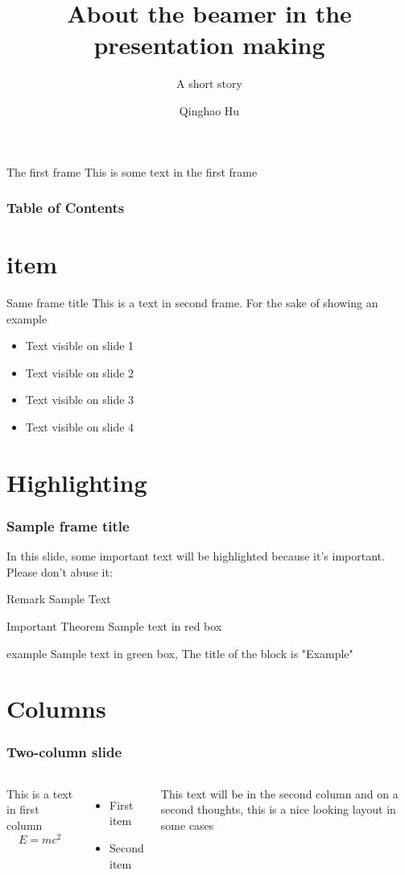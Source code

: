 \documentclass[10pt]{beamer}
\title[about the practice]
{About the beamer in the presentation making}
\subtitle{A short story}
\author{Qinghao Hu}
\begin{document}
\frame{\titlepage}

\begin{frame}{The first frame}
  This is some text in the first frame
\end{frame}

\begin{frame}
  \frametitle{Table of Contents}
  \tableofcontents
\end{frame}

\section{item}
\begin{frame}{Same frame title}
  This is a text in second frame. For the sake of showing an example
  \begin{itemize}
    \item Text visible on slide 1
    \item Text visible on slide 2 
    \item Text visible on slide 3
    \item Text visible on slide 4
  \end{itemize}
\end{frame}

\section{Highlighting}
\begin{frame}
  \frametitle{Sample frame title}
  In this slide, some important text will be \alert{highlighted} because it's important.
  Please don't abuse it:
  \begin{block}{Remark}
    Sample Text
  \end{block}

  \begin{alertblock}{Important Theorem} 
    Sample text in red box
  \end{alertblock}

  \begin{exampleblock}{example}
    Sample text in green box, The title of the block is "Example"
  \end{exampleblock}

\end{frame}

\section{Columns}
\begin{frame}
  \frametitle {Two-column slide}
  \begin{columns}
    This is a text in first column
    $$E = mc^2$$
    \begin{itemize}
      \item First item
      \item Second item
    \end{itemize}

    This text will be in the second column 
    and on a second thoughts, this is a nice looking layout in some cases
  \end{columns}
\end{frame}
\end{document}
